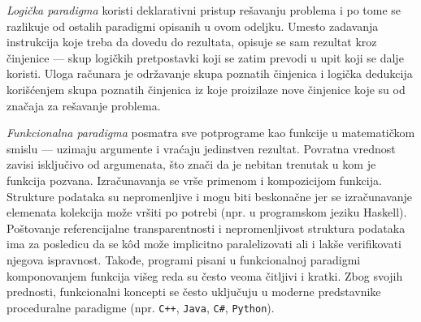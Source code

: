 \emph{Logička paradigma} koristi deklarativni pristup rešavanju problema i po tome se razlikuje od ostalih paradigmi opisanih u ovom odeljku. Umesto zadavanja instrukcija koje treba da dovedu do rezultata, opisuje se sam rezultat kroz činjenice --- skup logičkih pretpostavki koji se zatim prevodi u upit koji se dalje koristi. Uloga računara je održavanje skupa poznatih činjenica i logička dedukcija korišćenjem skupa poznatih činjenica iz koje proizilaze nove činjenice koje su od značaja za rešavanje problema. 

\emph{Funkcionalna paradigma} posmatra sve potprograme kao funkcije u matematičkom smislu --- uzimaju argumente i vraćaju jedinstven rezultat. Povratna vrednost zavisi isključivo od argumenata, što znači da je nebitan trenutak u kom je funkcija pozvana. Izračunavanja se vrše primenom i kompozicijom funkcija. Strukture podataka su nepromenljive i mogu biti beskonačne jer se izračunavanje elemenata kolekcija može vršiti po potrebi (npr. u programskom jeziku Haskell). Poštovanje referencijalne transparentnosti i nepromenljivost struktura podataka ima za posledicu da se k\^od može implicitno paralelizovati ali i lakše verifikovati njegova ispravnost. Takođe, programi pisani u funkcionalnoj paradigmi komponovanjem funkcija višeg reda su često veoma čitljivi i kratki. Zbog svojih prednosti, funkcionalni koncepti se često uključuju u moderne predstavnike proceduralne paradigme (npr. \texttt{C++}, \texttt{Java}, \texttt{C\#}, \texttt{Python}).
